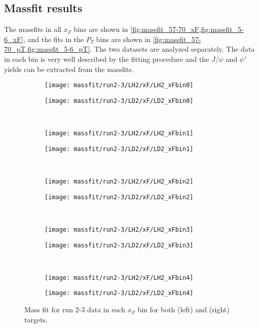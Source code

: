 \documentclass[../main.tex]{subfiles}
\begin{document}
\subsection{Massfit results}
The massfits in all $x_F$ bins are shown in \cref{fig:massfit_57-70_xF,fig:massfit_5-6_xF},
and the fits in the $P_T$ bins are shown in \cref{fig:massfit_57-70_pT,fig:massfit_5-6_pT}.
The two datasets are analyzed separately. The data in each bin is very well described by the fitting procedure
and the $J/\psi$ and $\psi'$ yields can be extracted from the massfits.
\begin{figure}[h]
	\centering
	\begin{subfigure}{0.4\linewidth}
		\texttt{[image: massfit/run2-3/LH2/xF/LH2\_xFbin0]}
	\end{subfigure}
	\begin{subfigure}{0.4\linewidth}
		\texttt{[image: massfit/run2-3/LD2/xF/LD2\_xFbin0]}
	\end{subfigure}\\
	\begin{subfigure}{0.4\linewidth}
		\texttt{[image: massfit/run2-3/LH2/xF/LH2\_xFbin1]}
	\end{subfigure}
	\begin{subfigure}{0.4\linewidth}
		\texttt{[image: massfit/run2-3/LD2/xF/LD2\_xFbin1]}
	\end{subfigure}\\
	\begin{subfigure}{0.4\linewidth}
		\texttt{[image: massfit/run2-3/LH2/xF/LH2\_xFbin2]}
	\end{subfigure}
	\begin{subfigure}{0.4\linewidth}
		\texttt{[image: massfit/run2-3/LD2/xF/LD2\_xFbin2]}
	\end{subfigure}\\
	\begin{subfigure}{0.4\linewidth}
		\texttt{[image: massfit/run2-3/LH2/xF/LH2\_xFbin3]}
	\end{subfigure}
	\begin{subfigure}{0.4\linewidth}
		\texttt{[image: massfit/run2-3/LD2/xF/LD2\_xFbin3]}
	\end{subfigure}\\
	\begin{subfigure}{0.4\linewidth}
		\texttt{[image: massfit/run2-3/LH2/xF/LH2\_xFbin4]}
	\end{subfigure}
	\begin{subfigure}{0.4\linewidth}
		\texttt{[image: massfit/run2-3/LD2/xF/LD2\_xFbin4]}
	\end{subfigure}
	\caption{Mass fit for run 2-3 data in each $x_F$ bin for both (left) and (right) targets. }
	\label{fig:massfit_57-70_xF}
\end{figure}
\end{document}

